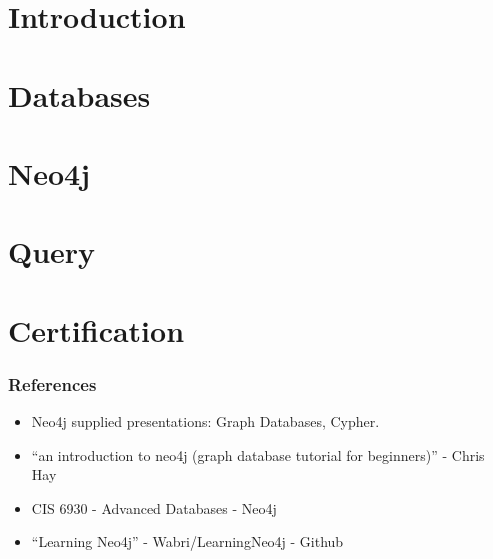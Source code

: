 \section[Intro]{Introduction}



\section[Db]{Databases}


\section[Neo4j]{Neo4j}


\section[Query]{Query}


\section[Cert]{Certification}


\begin{frame}\frametitle{References}
\begin{itemize}
\item Neo4j supplied presentations: Graph Databases, Cypher.
\item ``an introduction to neo4j (graph database tutorial for beginners)'' - Chris Hay
\item CIS 6930 - Advanced Databases - Neo4j 
\item ``Learning Neo4j'' - Wabri/LearningNeo4j - Github
\end{itemize}
\end{frame}